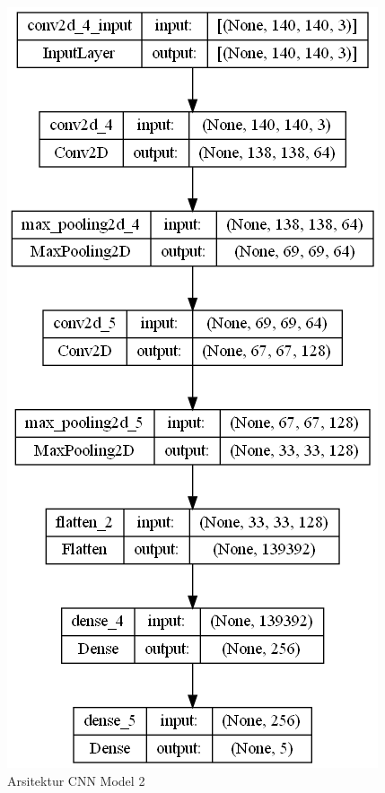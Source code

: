 \begin{figure}[H]
  \centering
  \includegraphics[scale=0.6]{gambar/tabelcnntdk.png}
  \caption{Arsitektur CNN Model 2}
  \label{fig:Arsitektur CNN Model 2}
\end{figure}



